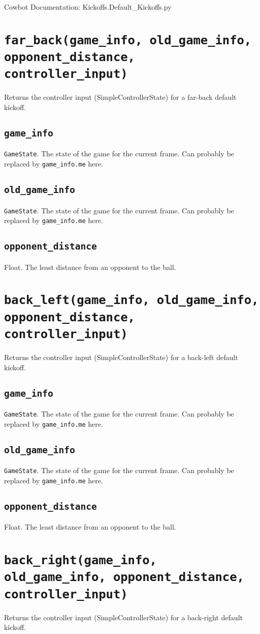 \documentclass{article}
\newcommand{\function}[1]{\section{\texttt{#1}}}
\newcommand{\argumenta}[1]{\subsection{\texttt{#1}}}
\begin{document}
\begin{flushleft}

\begin{center}
  Cowbot Documentation: Kickoffs.Default\_Kickoffs.py
\end{center}



\function{far\_back(game\_info, old\_game\_info, opponent\_distance, controller\_input)}
         {
           Returns the controller input (SimpleControllerState) for a far-back default kickoff.


           \argumenta{game\_info}
                     {
                       \texttt{GameState}.  The state of the game for the current frame.  Can probably be replaced by \texttt{game\_info.me} here.
                     }
           \argumenta{old\_game\_info}
                     {
                       \texttt{GameState}.  The state of the game for the current frame.  Can probably be replaced by \texttt{game\_info.me} here.
                     }
           \argumenta{opponent\_distance}
                     {
                       Float.  The least distance from an opponent to the ball.
                     }
         }
         

\function{back\_left(game\_info, old\_game\_info, opponent\_distance, controller\_input)}
         {
           Returns the controller input (SimpleControllerState) for a back-left default kickoff.

           \argumenta{game\_info}
                     {
                       \texttt{GameState}.  The state of the game for the current frame.  Can probably be replaced by \texttt{game\_info.me} here.
                     }
           \argumenta{old\_game\_info}
                     {
                       \texttt{GameState}.  The state of the game for the current frame.  Can probably be replaced by \texttt{game\_info.me} here.
                     }
           \argumenta{opponent\_distance}
                     {
                       Float.  The least distance from an opponent to the ball.
                     }
         }



\function{back\_right(game\_info, old\_game\_info, opponent\_distance, controller\_input)}
         {
           Returns the controller input (SimpleControllerState) for a back-right default kickoff.

}
\end{flushleft}
\end{document}
